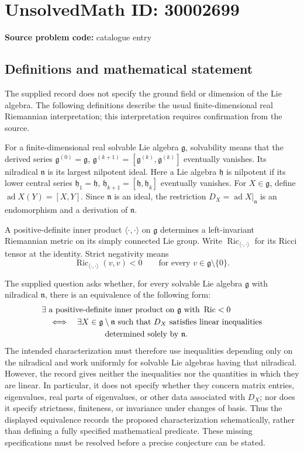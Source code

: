 \documentclass[11pt]{article}
\begin{document}
\section*{UnsolvedMath ID: 30002699}
\textbf{Source problem code:} catalogue entry
\subsection{Definitions and mathematical statement}
The supplied record does not specify the ground field or dimension of the Lie algebra. The following definitions describe the usual finite-dimensional real Riemannian interpretation; this interpretation requires confirmation from the source.

For a finite-dimensional real solvable Lie algebra \(\mathfrak g\), solvability means that the derived series \(\mathfrak g^{(0)}=\mathfrak g\), \(\mathfrak g^{(k+1)}=[\mathfrak g^{(k)},\mathfrak g^{(k)}]\) eventually vanishes. Its nilradical \(\mathfrak n\) is its largest nilpotent ideal. Here a Lie algebra \(\mathfrak h\) is nilpotent if its lower central series \(\mathfrak h_1=\mathfrak h\), \(\mathfrak h_{k+1}=[\mathfrak h,\mathfrak h_k]\) eventually vanishes. For \(X\in\mathfrak g\), define \(\operatorname{ad}X(Y)=[X,Y]\). Since \(\mathfrak n\) is an ideal, the restriction \(D_X=\left.\operatorname{ad}X\right|_{\mathfrak n}\) is an endomorphism and a derivation of \(\mathfrak n\).

A positive-definite inner product \(\langle\cdot,\cdot\rangle\) on \(\mathfrak g\) determines a left-invariant Riemannian metric on its simply connected Lie group. Write \(\operatorname{Ric}_{\langle\cdot,\cdot\rangle}\) for its Ricci tensor at the identity. Strict negativity means
\[
\operatorname{Ric}_{\langle\cdot,\cdot\rangle}(v,v)<0
\qquad\text{for every }v\in\mathfrak g\setminus\{0\}.
\]

The supplied question asks whether, for every solvable Lie algebra \(\mathfrak g\) with nilradical \(\mathfrak n\), there is an equivalence of the following form:
\[
\begin{aligned}
&\exists\text{ a positive-definite inner product on }\mathfrak g
   \text{ with }\operatorname{Ric}<0\\
&\quad\Longleftrightarrow\quad
\exists X\in\mathfrak g\setminus\mathfrak n
\text{ such that }D_X\text{ satisfies linear inequalities}\\
&\hspace{7.8em}\text{determined solely by }\mathfrak n.
\end{aligned}
\]
The intended characterization must therefore use inequalities depending only on the nilradical and work uniformly for solvable Lie algebras having that nilradical. However, the record gives neither the inequalities nor the quantities in which they are linear. In particular, it does not specify whether they concern matrix entries, eigenvalues, real parts of eigenvalues, or other data associated with \(D_X\); nor does it specify strictness, finiteness, or invariance under changes of basis. Thus the displayed equivalence records the proposed characterization schematically, rather than defining a fully specified mathematical predicate. These missing specifications must be resolved before a precise conjecture can be stated.
\end{document}
